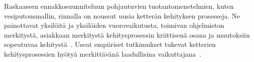 \documentclass[finnish]{../tktltiki2}
\theoremstyle{definition}
\theoremstyle{remark}
\begin{document}
    Raskaaseen ennakkosuunniteluun pohjautuvien tuotantomenetelmien, kuten vesiputousmallin, rinnalla on noussut uusia 
ketterän kehityksen prosesseja. Ne painottavat yksilöitä ja yksilöiden vuorovaikutusta, toimivan ohjelmiston merkitystä, 
asiakkaan merkitystä kehitysprosessin kriittisenä osana ja muutoksiin sopeutuvaa kehitystä~\cite{BBB01}. Useat 
empiiriset tutkimukset tukevat ketterien kehitysprosessien hyötyä merkittävänä laadullisina vaikuttajana~\cite{SS10}. 

\newpage




\end{document}
